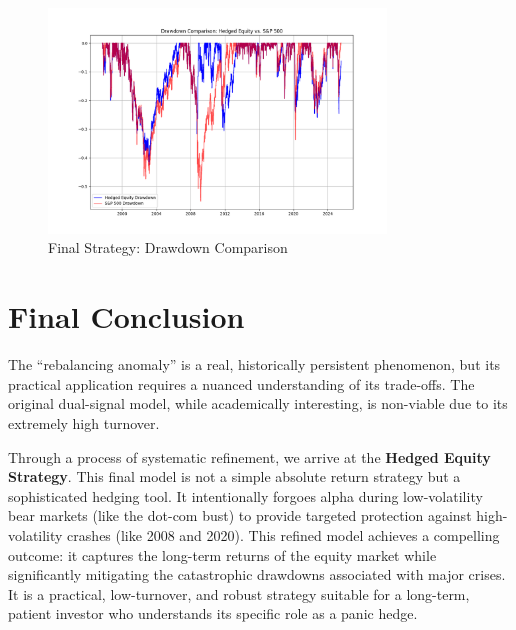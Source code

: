 \documentclass{article}
\begin{document}
\begin{figure}[htbp]
    \centering
    \includegraphics[width=0.8\textwidth]{plots/plot_hedged_equity_drawdowns.png}
    \caption{Final Strategy: Drawdown Comparison}
    \label{fig:hedged_equity_drawdowns}
\end{figure}

\section{Final Conclusion}
The ``rebalancing anomaly'' is a real, historically persistent phenomenon, but its practical application requires a nuanced understanding of its trade-offs. The original dual-signal model, while academically interesting, is non-viable due to its extremely high turnover.

Through a process of systematic refinement, we arrive at the \textbf{Hedged Equity Strategy}. This final model is not a simple absolute return strategy but a sophisticated hedging tool. It intentionally forgoes alpha during low-volatility bear markets (like the dot-com bust) to provide targeted protection against high-volatility crashes (like 2008 and 2020). This refined model achieves a compelling outcome: it captures the long-term returns of the equity market while significantly mitigating the catastrophic drawdowns associated with major crises. It is a practical, low-turnover, and robust strategy suitable for a long-term, patient investor who understands its specific role as a panic hedge.
\end{document}
